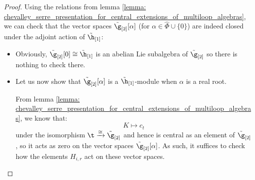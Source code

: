             \begin{proof}
                Using the relations from lemma \ref{lemma: chevalley_serre_presentation_for_central_extensions_of_multiloop_algebras}, we can check that the vector spaces $\tilde{\g}_{[2]}[\alpha]$ (for $\alpha \in \hat{\Phi} \cup \{0\}$) are indeed closed under the adjoint action of $\tilde{\h}_{[1]}$:
                \begin{itemize}
                    \item Obviously, $\tilde{\g}_{[2]}[0] \cong \tilde{\h}_{[1]}$ is an abelian Lie subalgebra of $\tilde{\g}_{[2]}$ so there is nothing to check there. 
                    \item Let us now show that $\tilde{\g}_{[2]}[\alpha]$ is a $\tilde{\h}_{[1]}$-module when $\alpha$ is a real root.
                    
                    From lemma \ref{lemma: chevalley_serre_presentation_for_central_extensions_of_multiloop_algebras}, we know that:
                        $$K \mapsto c_t$$
                    under the isomorphism $\t \xrightarrow[]{\cong} \tilde{\g}_{[2]}$ and hence is central as an element of $\tilde{\g}_{[2]}$, so it acts as zero on the vector spaces $\tilde{\g}_{[2]}[\alpha]$. As such, it suffices to check how the elements $H_{i, r}$ act on these vector spaces. 
                    

\end{itemize}
\end{proof}
